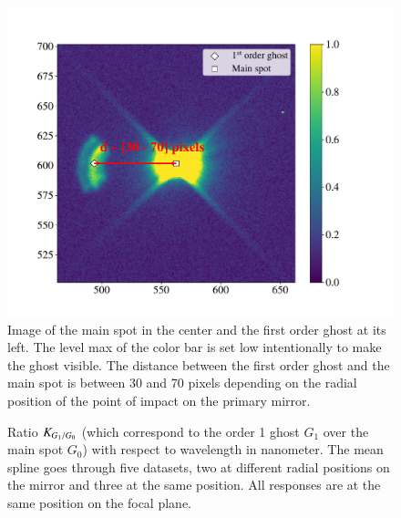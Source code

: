 \begin{figure}[h]
    \centering
    \includegraphics[width=\columnwidth]{fig/ghost_contrast.pdf}
    \caption{Image of the main spot in the center and the first order ghost at its left. The level max of the color bar is set low intentionally to make the ghost visible. The distance between the first order ghost and the main spot is between 30 and 70 pixels depending on the radial position of the point of impact on the \SD primary mirror.}
    \label{fig:ghost_contrast}
\end{figure}


 \begin{figure}[h]
     \centering
     \caption{Ratio $K_{G_1/G_0}$ (which correspond to the order 1 ghost $G_{1}$ over the main spot $G_0$) with respect to wavelength in nanometer. The mean spline goes through five datasets, two at different radial positions on the mirror and three at the same position. All responses are at the same position on the focal plane.}
     \label{fig:ghost_ratio}
 \end{figure}
 
